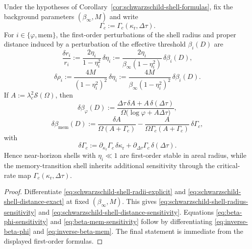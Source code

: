 \begin{corollary}\label{cor:schwarzschild-threshold-sensitivity}
Under the hypotheses of Corollary~\ref{cor:schwarzschild-shell-formulas}, fix the background parameters $(\beta_\infty,M)$ and write
\[
\Gamma_c:=\Gamma_c(\kappa_{\mathrm r},\Delta\tau).
\]
For $i\in\{\varphi,\mathrm{mem}\}$, the first-order perturbations of the shell radius and proper distance induced by a perturbation of the effective threshold $\beta_i(D)$ are
\begin{equation}\label{eq:schwarzschild-shell-radius-sensitivity}
\frac{\delta r_i}{r_i}
:=
\frac{2\eta_i}{1-\eta_i^2}\,\delta\eta_i
:=
\frac{2\eta_i}{\beta_\infty(1-\eta_i^2)}\,\delta\beta_i(D),
\end{equation}
\begin{equation}\label{eq:schwarzschild-shell-distance-sensitivity}
\delta\rho_i
:=
\frac{4M}{(1-\eta_i^2)^2}\,\delta\eta_i
:=
\frac{4M}{\beta_\infty(1-\eta_i^2)^2}\,\delta\beta_i(D).
\end{equation}
If $A:=\lambda_c^2\mathcal S(\Omega)$, then
\begin{equation}\label{eq:beta-phi-sensitivity}
\delta\beta_\varphi(D)
:=
\frac{\Delta\tau\,\delta A+A\,\delta(\Delta\tau)}
     {\Omega\bigl(\log\varphi+A\Delta\tau\bigr)},
\end{equation}
\begin{equation}\label{eq:beta-mem-sensitivity}
\delta\beta_{\mathrm{mem}}(D)
:=
\frac{\delta A}{\Omega(A+\Gamma_c)}
-
\frac{A}{\Omega\Gamma_c(A+\Gamma_c)}\,\delta\Gamma_c,
\end{equation}
with
\[
\delta\Gamma_c
:=
\partial_{\kappa_{\mathrm r}}\Gamma_c\,\delta\kappa_{\mathrm r}
+
\partial_{\Delta\tau}\Gamma_c\,\delta(\Delta\tau).
\]
Hence near-horizon shells with $\eta_i\ll 1$ are first-order stable in areal radius, while the memory-transition shell inherits additional sensitivity through the critical-rate map $\Gamma_c(\kappa_{\mathrm r},\Delta\tau)$.
\end{corollary}

\begin{proof}
Differentiate \eqref{eq:schwarzschild-shell-radii-explicit} and \eqref{eq:schwarzschild-shell-distance-exact} at fixed $(\beta_\infty,M)$. This gives \eqref{eq:schwarzschild-shell-radius-sensitivity} and \eqref{eq:schwarzschild-shell-distance-sensitivity}. Equations \eqref{eq:beta-phi-sensitivity} and \eqref{eq:beta-mem-sensitivity} follow by differentiating \eqref{eq:inverse-beta-phi} and \eqref{eq:inverse-beta-mem}. The final statement is immediate from the displayed first-order formulas.
\end{proof}

